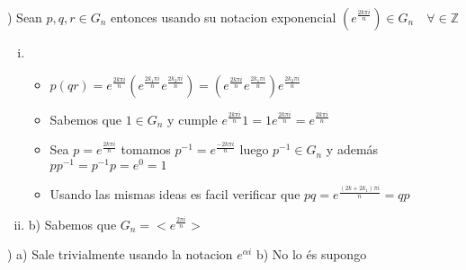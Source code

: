 \documentclass[12pt]{article}
\theoremstyle{definition}
\begin{document}
) Sean $p,q,r \in G_{n}$ entonces usando su notacion exponencial $(e^{\frac{2k \pi i}{n}}) \in G_{n} \quad \forall \in \mathbb{Z}$
\begin{enumerate}[i.]
  \item
    \begin{itemize}
      \item $p(qr) = e^{\frac{2k \pi i}{n}} (e^{\frac{2k_{1} \pi i}{n}}e^{\frac{2k_{2} \pi i}{n}}) = (e^{\frac{2k \pi i}{n}} e^{\frac{2k_{1} \pi i}{n}})e^{\frac{2k_{2} \pi i}{n}}$
      \item Sabemos que $1 \in G_{n}$ y cumple $e^{\frac{2k \pi i}{n}}1 = 1e^{\frac{2k \pi i}{n}} = e^{\frac{2k \pi i}{n}}$
      \item Sea $p = e^{\frac{2k \pi i}{n}}$ tomamos $p^{-1} = e^{\frac{-2k \pi i}{n}}$ luego $p^{-1} \in G_{n}$ y además $pp^{-1} = p^{-1}p = e ^ 0 = 1$
      \item Usando las mismas ideas es facil verificar que $pq = e^{\frac{(2k + 2k_{1}) \pi i}{n}}= qp$
    \end{itemize}
  \item b) Sabemos que $G_{n} = <e^{\frac{2 \pi i}{n}}>$

\end{enumerate}


) a) Sale trivialmente usando la notacion $e^{\alpha i}$
b) No lo és supongo\\
\end{document}
